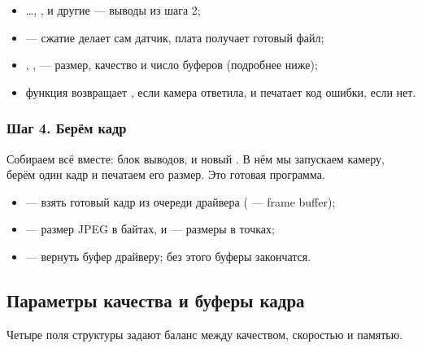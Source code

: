 
\begin{itemize}[leftmargin=*]
  \item {}\ldots{}, ,  и другие --- выводы из шага 2;
  \item {} --- сжатие делает сам датчик, плата получает готовый файл;
  \item {}, ,  --- размер, качество и число буферов (подробнее ниже);
  \item функция возвращает , если камера ответила, и печатает код ошибки, если нет.
\end{itemize}

\subsubsection{Шаг 4. Берём кадр}

Собираем всё вместе: блок выводов,  и новый . В нём мы запускаем камеру,
берём один кадр и печатаем его размер. Это готовая программа.


\begin{itemize}[leftmargin=*]
  \item {} --- взять готовый кадр из очереди драйвера ( --- frame buffer);
  \item {} --- размер JPEG в байтах,  и  --- размеры в точках;
  \item {} --- вернуть буфер драйверу; без этого буферы закончатся.
\end{itemize}

\subsection{Параметры качества и буферы кадра}

Четыре поля структуры задают баланс между качеством, скоростью и памятью.

